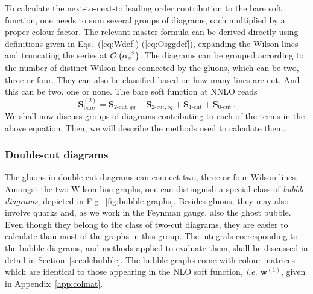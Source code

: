 \documentclass[a4paper,11pt]{article}
\newcommand{\qqbar}{{\ensuremath{q \bar q}}\xspace}
\newcommand{\as}{{\alpha_s}}
\newcommand{\bfS}{\bm{S}}
\newcommand{\ie}{{\it i.e. }}
\newcommand{\order}[1]{{{\cal O}\left(#1\right)}}
\newcommand{\bfw}{\bm{w}}
\numberwithin{equation}{section}
\begin{document}
To calculate the next-to-next-to leading order contribution to the bare soft
function, one needs to sum several groups of diagrams, each multiplied by a
proper colour factor. The relevant master formula can be derived directly using
definitions given in Eqs.~(\ref{eq:Wdef})-(\ref{eq:Osggdef}), expanding the Wilson
lines and truncating the series at $\order{\as^2}$.
%
The diagrams can be grouped according to the number of distinct Wilson lines
connected by the gluons, which can be two, three or four. They can also be
classified based on how many lines are cut. And this can be two, one or none.
%
The bare soft function at NNLO reads
%
\begin{equation}
  \label{eq:bareSFNNLOdef}
  \bfS^{(2)}_\text{bare} = \bfS_{\text{2-cut}, gg} +
            \bfS_{\text{2-cut}, \qqbar} + 
            \bfS_{\text{1-cut}} +
            \bfS_{\text{0-cut}}\,.
\end{equation}
%
We shall now discuss groups of diagrams contributing to each of the terms in
the above equation. Then, we will describe the methods used to calculate them.

\subsubsection*{Double-cut diagrams}

The gluons in double-cut diagrams can connect two, three or four Wilson lines.
Amongst the two-Wilson-line graphs, one can distinguish a special class of
\emph{bubble diagrams}, depicted in Fig.~\ref{fig:bubble-graphs}. Besides gluons,
they may also involve quarks and, as we work in the Feynman gauge, also the ghost bubble. 
%
Even though they belong to the class of two-cut diagrams, they are easier to
calculate than most of the graphs in this group. The
integrals corresponding to the bubble diagrams, and methods applied to evaluate
them, shall be discussed in detail in Section~\ref{sec:debubble}. The bubble graphs come with colour matrices which
are identical to those appearing in the NLO soft function, \ie $\bfw^{(1)}$, given
in Appendix~\ref{app:colmat}.
\end{document}
